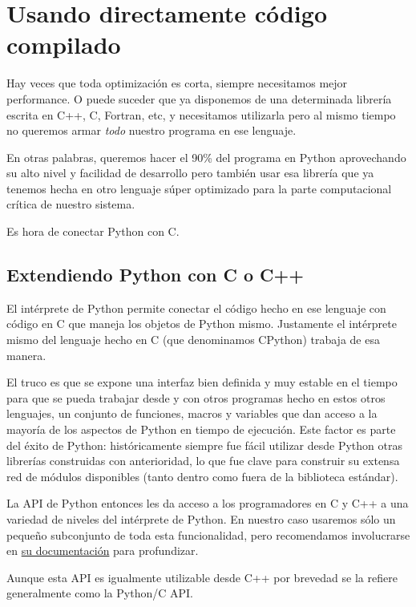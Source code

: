 \section{Usando directamente código compilado}

Hay veces que toda optimización es corta, siempre necesitamos mejor performance. O puede suceder que ya disponemos de una determinada librería escrita en C++, C, Fortran, etc, y necesitamos utilizarla pero al mismo tiempo no queremos armar \textit{todo} nuestro programa en ese lenguaje.

En otras palabras, queremos hacer el 90\% del programa en Python aprovechando su alto nivel y facilidad de desarrollo pero también usar esa librería que ya tenemos hecha en otro lenguaje súper optimizado para la parte computacional crítica de nuestro sistema.

Es hora de conectar Python con C.


\subsection{Extendiendo Python con C o C++}

El intérprete de Python permite conectar el código hecho en ese lenguaje con código en C que maneja los objetos de Python mismo. Justamente el intérprete mismo del lenguaje hecho en C (que denominamos CPython) trabaja de esa manera.

El truco es que se expone una interfaz bien definida y muy estable en el tiempo para que se pueda trabajar desde y con otros programas hecho en estos otros lenguajes, un conjunto de funciones, macros y variables que dan acceso a la mayoría de los aspectos de Python en tiempo de ejecución. Este factor es parte del éxito de Python: históricamente siempre fue fácil utilizar desde Python otras librerías construidas con anterioridad, lo que fue clave para construir su extensa red de módulos disponibles (tanto dentro como fuera de la biblioteca estándar).

La API de Python entonces les da acceso a los programadores en C y C++ a una variedad de niveles del intérprete de Python. En nuestro caso usaremos sólo un pequeño subconjunto de toda esta funcionalidad, pero recomendamos involucrarse en \href{https://docs.python.org/es/dev/c-api/index.html}{su documentación} para profundizar.

\begin{info}
Aunque esta API es igualmente utilizable desde C++ por brevedad se la refiere generalmente como la Python/C API.
\end{info}


